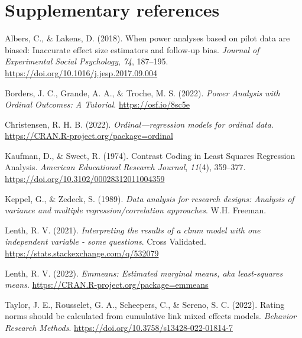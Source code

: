 \documentclass[
  bookmarksnumbered]{article}
\newlength{\cslhangindent}
\newlength{\cslentryspacingunit} %
\newenvironment{CSLReferences}[2] %
 {%
  \setlength{\parindent}{0pt}
  \ifodd #1
  \let\oldpar\par
  \def\par{\hangindent=\cslhangindent\oldpar}
  \fi
  \setlength{\parskip}{#2\cslentryspacingunit}
 }%
 {}
\begin{document}
\hypertarget{refs}{%
\section*{Supplementary references}\label{refs}}

\hypertarget{refs}{}
\begin{CSLReferences}{1}{0}
\leavevmode{}%
Albers, C., \& Lakens, D. (2018). When power analyses based on pilot data are biased: {Inaccurate} effect size estimators and follow-up bias. \emph{Journal of Experimental Social Psychology}, \emph{74}, 187--195. \url{https://doi.org/10.1016/j.jesp.2017.09.004}

\leavevmode{}%
Borders, J. C., Grande, A. A., \& Troche, M. S. (2022). \emph{Power {Analysis} with {Ordinal Outcomes}: {A Tutorial}}. \url{https://osf.io/8sc5e}

\leavevmode{}%
Christensen, R. H. B. (2022). \emph{Ordinal---regression models for ordinal data}. \url{https://CRAN.R-project.org/package=ordinal}

\leavevmode{}%
Kaufman, D., \& Sweet, R. (1974). Contrast {Coding} in {Least Squares Regression Analysis}. \emph{American Educational Research Journal}, \emph{11}(4), 359--377. \url{https://doi.org/10.3102/00028312011004359}

\leavevmode{}%
Keppel, G., \& Zedeck, S. (1989). \emph{Data analysis for research designs: {Analysis} of variance and multiple regression/correlation approaches}. {W.H. Freeman}.

\leavevmode{}%
Lenth, R. V. (2021). \emph{Interpreting the results of a clmm model with one independent variable - some questions}. Cross Validated. \url{https://stats.stackexchange.com/q/532079}

\leavevmode{}%
Lenth, R. V. (2022). \emph{Emmeans: Estimated marginal means, aka least-squares means}. \url{https://CRAN.R-project.org/package=emmeans}

\leavevmode{}%
Taylor, J. E., Rousselet, G. A., Scheepers, C., \& Sereno, S. C. (2022). Rating norms should be calculated from cumulative link mixed effects models. \emph{Behavior Research Methods}. \url{https://doi.org/10.3758/s13428-022-01814-7}


\end{CSLReferences}
\end{document}
